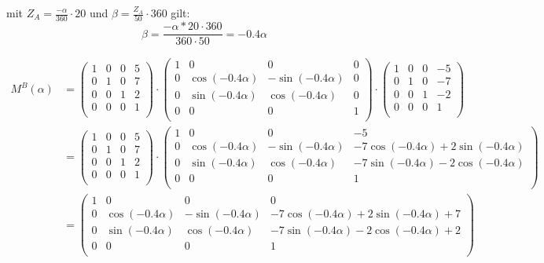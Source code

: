 \documentclass[a4paper,10pt,DIV=14]{article}
\begin{document}
mit $Z_A = \frac{-\alpha}{360} \cdot 20$ und $\beta = \frac{Z_A}{50} \cdot 360$ gilt:
$$ \beta = \frac{- \alpha * 20 \cdot 360}{360 \cdot 50} = -0.4 \alpha$$

\begin{align*}
	M^B(\alpha) & = \begin{pmatrix}
						1 & 0 & 0 & 5 \\
						0 & 1 & 0 & 7 \\
						0 & 0 & 1 & 2 \\
						0 & 0 & 0 & 1 \\
					\end{pmatrix} \cdot
					\begin{pmatrix}
						1 & 0                & 0                 & 0 \\
						0 & \cos(-0.4\alpha) & -\sin(-0.4\alpha) & 0 \\
						0 & \sin(-0.4\alpha) & \cos(-0.4\alpha)  & 0 \\
						0 & 0                & 0                 & 1 \\
					\end{pmatrix} \cdot
					\begin{pmatrix}
						1 & 0 & 0 & -5 \\
						0 & 1 & 0 & -7 \\
						0 & 0 & 1 & -2 \\
						0 & 0 & 0 & 1  \\
					\end{pmatrix} \\
				& = \begin{pmatrix}
						1 & 0 & 0 & 5 \\
						0 & 1 & 0 & 7 \\
						0 & 0 & 1 & 2 \\
						0 & 0 & 0 & 1 \\
					\end{pmatrix} \cdot
					\begin{pmatrix}
						1 & 0                & 0                 & -5                                     \\
						0 & \cos(-0.4\alpha) & -\sin(-0.4\alpha) & -7\cos(-0.4\alpha) + 2\sin(-0.4\alpha) \\
						0 & \sin(-0.4\alpha) & \cos(-0.4\alpha)  & -7\sin(-0.4\alpha) - 2\cos(-0.4\alpha) \\
						0 & 0                & 0                 & 1                                      \\
					\end{pmatrix} \\
				& = \begin{pmatrix}
						1 & 0                & 0                 & 0                                          \\
						0 & \cos(-0.4\alpha) & -\sin(-0.4\alpha) & -7\cos(-0.4\alpha) + 2\sin(-0.4\alpha) + 7 \\
						0 & \sin(-0.4\alpha) & \cos(-0.4\alpha)  & -7\sin(-0.4\alpha) - 2\cos(-0.4\alpha) + 2 \\
						0 & 0                & 0                 & 1                                          \\
					\end{pmatrix}
\end{align*}
\end{document}
